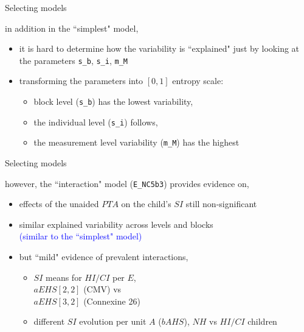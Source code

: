 %
%
\begin{lhframe}[rhgraphic={\texttt{[image: variability\_plot.pdf]}}]
	{Selecting models}
	
	in addition in the ``simplest" model,
	\begin{itemize}
		\item it is hard to determine how the variability is ``explained" just by looking at the parameters \texttt{s\_b}, \texttt{s\_i}, \texttt{m\_M}
		\item transforming the parameters into $[0,1]$ entropy scale:
		\begin{itemize}
			\item block level (\texttt{s\_b}) has the lowest variability,
			\item the individual level (\texttt{s\_i}) follows,
			\item the measurement level variability (\texttt{m\_M}) has the highest
		\end{itemize}
	\end{itemize}
\end{lhframe}
%
%
\begin{lhframe}[rhgraphic={\texttt{[image: select\_model2.png]}}]
	{Selecting models}
	
	however, the ``interaction" model (\texttt{E\_NC5b3}) provides evidence on,
	\begin{itemize}
		\item effects of the unaided $PTA$ on the child's $SI$ still non-significant
		\item similar explained variability across levels and blocks \\
		{\small \textcolor{blue}{(similar to the ``simplest" model)}}
		\item but ``mild" evidence of prevalent interactions,
		\begin{itemize}
			\item $SI$ means for $HI/CI$ per $E$, \\
			$aEHS[2,2]$ (CMV) vs \\
			$aEHS[3,2]$ (Connexine 26)
			\item different $SI$ evolution per unit $A$ ($bAHS$), $NH$ vs $HI/CI$ children
		\end{itemize}
	\end{itemize}
\end{lhframe}
%
%
